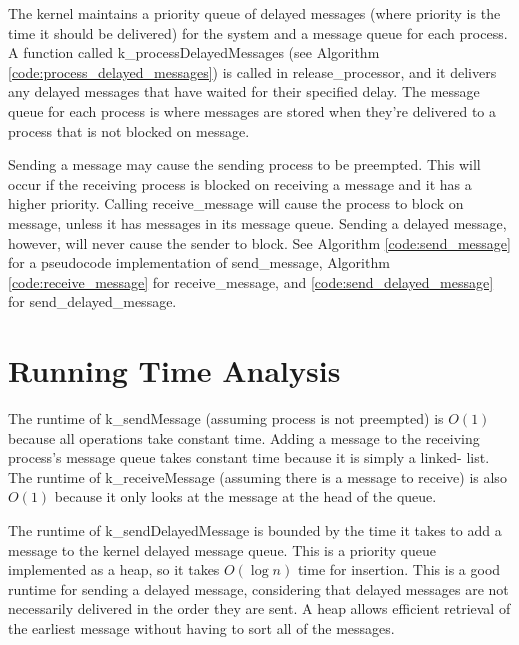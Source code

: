 \documentclass[12pt]{report}
\begin{document}
    The kernel maintains a priority queue of delayed messages (where priority is
    the time it should be delivered) for the system and a message queue for each
    process. A function called k\_processDelayedMessages (see Algorithm
    \ref{code:process_delayed_messages}) is called in release\_processor, and it
    delivers any delayed messages that have waited for their specified delay.
    The  message queue for each process is where messages are stored when
    they're delivered to a process that is not blocked on message.

    Sending a message may cause the sending process to be preempted. This will
    occur if the receiving process is blocked on receiving a message and it has
    a higher priority. Calling receive\_message will cause the process to block
    on message, unless it has messages in its message queue. Sending a delayed
    message, however, will never cause  the sender to block. See Algorithm
    \ref{code:send_message} for a pseudocode implementation  of send\_message,
    Algorithm \ref{code:receive_message} for receive\_message, and
    \ref{code:send_delayed_message} for send\_delayed\_message.

\section{Running Time Analysis}

    The runtime of k\_sendMessage (assuming process is not preempted) is $O(1)$
    because all operations take constant time. Adding a message to the receiving
    process's message queue  takes constant time because it is simply a linked-
    list. The runtime of k\_receiveMessage (assuming there is a message to
    receive)  is also $O(1)$ because it only looks at the message at the head of
    the queue.

    The runtime of k\_sendDelayedMessage is bounded by the time it takes to add
    a  message to the kernel delayed message queue. This is a priority queue
    implemented  as a heap, so it takes $O(\log n)$ time for insertion. This is
    a good runtime for sending a delayed message, considering that delayed
    messages are not necessarily delivered in the order they are sent. A heap
    allows efficient retrieval of the earliest message without having to sort
    all of the messages.
\end{document}
